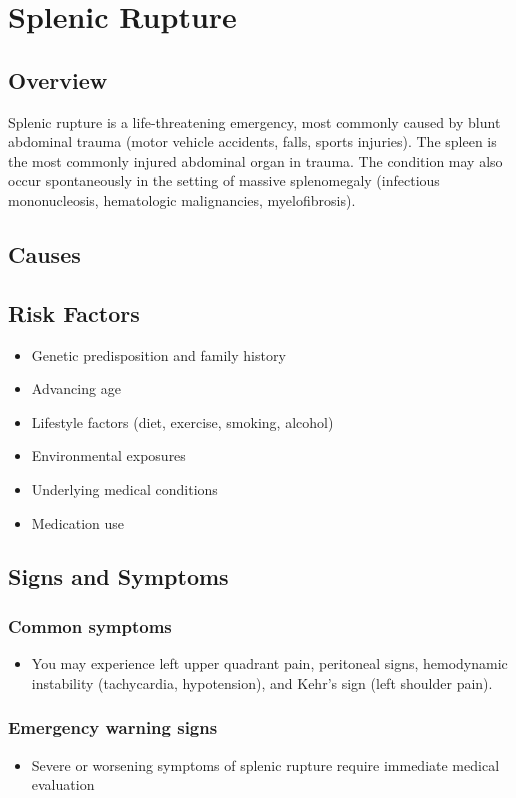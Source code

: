\chapter{Splenic Rupture}
\label{sec:Splenic Rupture}

\section{Overview}
Splenic rupture is a life-threatening emergency, most commonly caused by blunt abdominal trauma (motor vehicle accidents, falls, sports injuries). The spleen is the most commonly injured abdominal organ in trauma. The condition may also occur spontaneously in the setting of massive splenomegaly (infectious mononucleosis, hematologic malignancies, myelofibrosis).
\section{Causes}
\section{Risk Factors}

\begin{itemize}[noitemsep]
  \item Genetic predisposition and family history
  \item Advancing age
  \item Lifestyle factors (diet, exercise, smoking, alcohol)
  \item Environmental exposures
  \item Underlying medical conditions
  \item Medication use
\end{itemize}
\section{Signs and Symptoms}

\subsection{Common symptoms}
\begin{itemize}[noitemsep]
  \item You may experience left upper quadrant pain, peritoneal signs, hemodynamic instability (tachycardia, hypotension), and Kehr's sign (left shoulder pain). 
  \end{itemize}

\subsection{Emergency warning signs}
\begin{itemize}[noitemsep]
  \item Severe or worsening symptoms of splenic rupture require immediate medical evaluation
\end{itemize}
